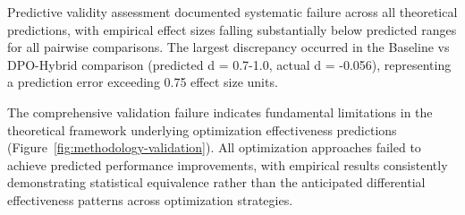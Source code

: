 Predictive validity assessment documented systematic failure across all theoretical predictions, with empirical effect sizes falling substantially below predicted ranges for all pairwise comparisons. The largest discrepancy occurred in the Baseline vs DPO-Hybrid comparison (predicted d = 0.7-1.0, actual d = -0.056), representing a prediction error exceeding 0.75 effect size units.

The comprehensive validation failure indicates fundamental limitations in the theoretical framework underlying optimization effectiveness predictions (Figure~\ref{fig:methodology-validation}). All optimization approaches failed to achieve predicted performance improvements, with empirical results consistently demonstrating statistical equivalence rather than the anticipated differential effectiveness patterns across optimization strategies.